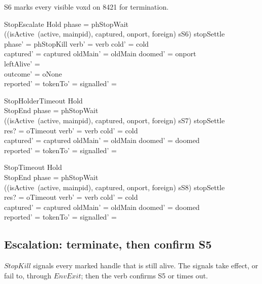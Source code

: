 \documentclass[a4paper,10pt,fleqn]{article}
\begin{document}
S6 marks every visible voxd on 8421 for termination.

\begin{schema}{StopEscalate}
  Hold
\where
  phase = phStopWait \\
  ((isActive~(active, mainpid), captured, onport, foreign) \mapsto sS6) \in stopSettle \\
  phase' = phStopKill \land verb' = verb \land cold' = cold \\
  captured' = captured \land oldMain' = oldMain \land doomed' = onport \\
  leftAlive' = \emptyset \\
  outcome' = oNone \\
  reported' = \emptyset \land tokenTo' = \emptyset \land
    signalled' = \emptyset
\end{schema}

\begin{schema}{StopHolderTimeout}
  Hold \\
  StopEnd
\where
  phase = phStopWait \\
  ((isActive~(active, mainpid), captured, onport, foreign) \mapsto sS7) \in stopSettle \\
  res? = oTimeout \land verb' = verb \land cold' = cold \\
  captured' = captured \land oldMain' = oldMain \land doomed' = doomed \\
  reported' = \emptyset \land tokenTo' = \emptyset \land
    signalled' = \emptyset
\end{schema}

\begin{schema}{StopTimeout}
  Hold \\
  StopEnd
\where
  phase = phStopWait \\
  ((isActive~(active, mainpid), captured, onport, foreign) \mapsto sS8) \in stopSettle \\
  res? = oTimeout \land verb' = verb \land cold' = cold \\
  captured' = captured \land oldMain' = oldMain \land doomed' = doomed \\
  reported' = \emptyset \land tokenTo' = \emptyset \land
    signalled' = \emptyset
\end{schema}

\subsection{Escalation: terminate, then confirm S5}

$StopKill$ signals every marked handle that is still alive. The signals take
effect, or fail to, through $EnvExit$; then the verb confirms S5 or times out.
\end{document}
